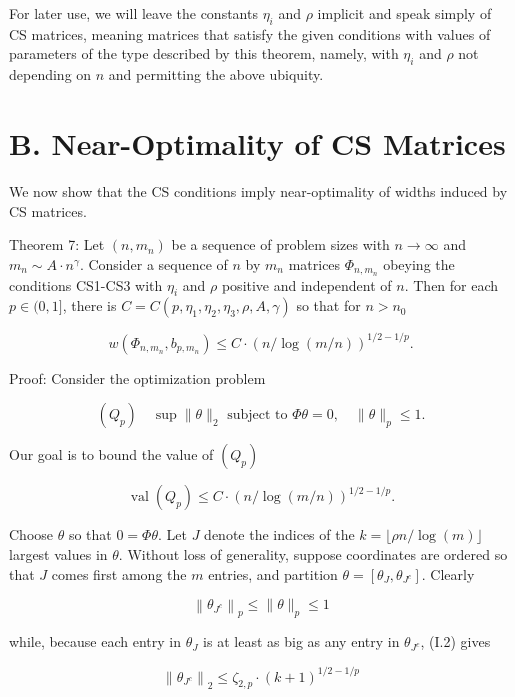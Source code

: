 \documentclass[10pt]{article}
\begin{document}
For later use, we will leave the constants $\eta_{i}$ and $\rho$ implicit and speak simply of CS matrices, meaning matrices that satisfy the given conditions with values of parameters of the type described by this theorem, namely, with $\eta_{i}$ and $\rho$ not depending on $n$ and permitting the above ubiquity.

\section*{B. Near-Optimality of CS Matrices}
We now show that the CS conditions imply near-optimality of widths induced by CS matrices.

Theorem 7: Let $\left(n, m_{n}\right)$ be a sequence of problem sizes with $n \rightarrow \infty$ and $m_{n} \sim A \cdot n^{\gamma}$. Consider a sequence of $n$ by $m_{n}$ matrices $\Phi_{n, m_{n}}$ obeying the conditions CS1-CS3 with $\eta_{i}$ and $\rho$ positive and independent of $n$. Then for each $p \in(0,1]$, there is $C=C\left(p, \eta_{1}, \eta_{2}, \eta_{3}, \rho, A, \gamma\right)$ so that for $n>n_{0}$

$$
w\left(\Phi_{n, m_{n}}, b_{p, m_{n}}\right) \leq C \cdot(n / \log (m / n))^{1 / 2-1 / p} .
$$

Proof: Consider the optimization problem

$$
\left(Q_{p}\right) \quad \sup \|\theta\|_{2} \text { subject to } \Phi \theta=0, \quad\|\theta\|_{p} \leq 1 .
$$

Our goal is to bound the value of $\left(Q_{p}\right)$

$$
\operatorname{val}\left(Q_{p}\right) \leq C \cdot(n / \log (m / n))^{1 / 2-1 / p} .
$$

Choose $\theta$ so that $0=\Phi \theta$. Let $J$ denote the indices of the $k= \lfloor\rho n / \log (m)\rfloor$ largest values in $\theta$. Without loss of generality, suppose coordinates are ordered so that $J$ comes first among the $m$ entries, and partition $\theta=\left[\theta_{J}, \theta_{J^{c}}\right]$. Clearly


\begin{equation*}
\left\|\theta_{J^{c}}\right\|_{p} \leq\|\theta\|_{p} \leq 1 \tag{II.2}
\end{equation*}


while, because each entry in $\theta_{J}$ is at least as big as any entry in $\theta_{J^{c}}$, (I.2) gives


\begin{equation*}
\left\|\theta_{J^{c}}\right\|_{2} \leq \zeta_{2, p} \cdot(k+1)^{1 / 2-1 / p} \tag{II.3}
\end{equation*}
\end{document}

